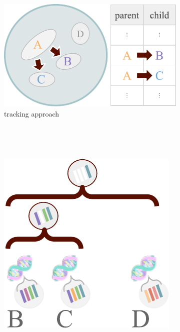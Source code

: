 \begin{figure}
\begin{minipage}{0.65\linewidth}
\begin{subfigure}{0.55\linewidth}
  \includegraphics[width=\linewidth]{img/tracking-schematic}
  \caption{\footnotesize tracking approach}
  \label{fig:tracking-vs-reconstruction-schematic:tracking}
\end{subfigure}%
\begin{subfigure}{0.025\linewidth}~\end{subfigure}%
\vrule
\begin{subfigure}{0.025\linewidth}~\end{subfigure}%
\begin{subfigure}{0.35\linewidth}
  \centering
  \includegraphics[width=\linewidth]{img/reconstruction-schematic}

\end{subfigure}
\end{minipage}
\end{figure}
